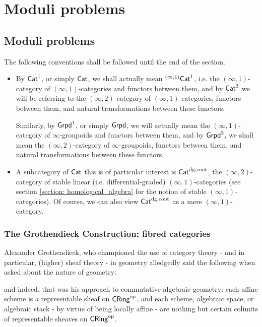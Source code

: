 \chapter{Moduli problems}
    \begin{abstract}
        
    \end{abstract}
    
    \minitoc

    \section{Moduli problems} \label{section: moduli_problems}
        The following conventions shall be followed until the end of the section.
        \begin{convention}
            \begin{itemize}
                \item By $\mathsf{Cat}^1$, or simply $\mathsf{Cat}$, we shall actually mean ${}^{(\infty, 1)}\mathsf{Cat}^1$, i.e. the $(\infty, 1)$-category of $(\infty, 1)$-categories and functors between them, and by $\mathsf{Cat}^2$ we will be referring to the $(\infty, 2)$-category of $(\infty, 1)$-categories, functors between them, and natural transformations between these functors. 
                
                Similarly, by $\mathsf{Grpd}^1$, or simply $\mathsf{Grpd}$, we will actually mean the $(\infty, 1)$-category of $\infty$-groupoids and functors between them, and by $\mathsf{Grpd}^2$, we shall mean the $(\infty, 2)$-category of $\infty$-groupoids, functors between them, and natural transformations between these functors.
                \item A subcategory of $\mathsf{Cat}$ this is of particular interest is $\mathsf{Cat}^{\mathrm{dg}, \mathrm{cont}}$, the $(\infty, 2)$-category of stable linear (i.e. differential-graded) $(\infty, 1)$-categories (see section \ref{section: homological_algebra} for the notion of stable $(\infty, 1)$-categories). Of course, we can also view $\mathsf{Cat}^{\mathrm{dg}, \mathrm{cont}}$ as a mere $(\infty, 1)$-category.
            \end{itemize} 
        \end{convention}
    
        \subsection{The Grothendieck Construction; fibred categories}
            Alexander Grothendieck, who championed the use of category theory - and in particular, (higher) sheaf theory - in geometry alledgedly said the following when asked about the nature of geometry:
                \begin{center}
                \end{center}
            and indeed, that was his approach to commutative algebraic geometry: each affine scheme is a representable sheaf on $\mathsf{CRing}^{\mathrm{op}}$, and each scheme, algebraic space, or algebraic stack - by virtue of being locally affine - are nothing but certain colimits of representable sheaves on $\mathsf{CRing}^{\mathrm{op}}$. 
            
